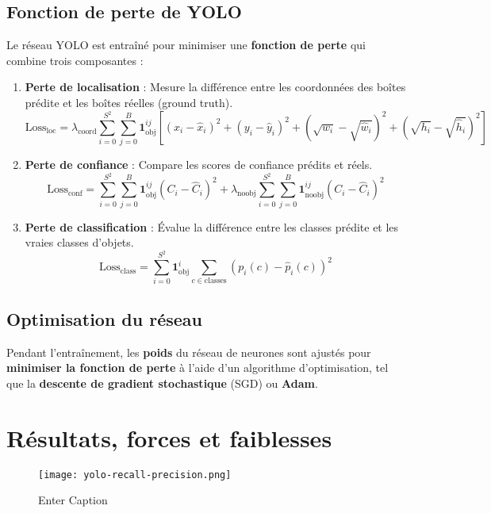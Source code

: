 \documentclass[a4paper,12pt]{article}
\begin{document}
\subsection{Fonction de perte de YOLO}

Le réseau YOLO est entraîné pour minimiser une \textbf{fonction de perte} qui combine trois composantes :
\begin{enumerate}
    \item \textbf{Perte de localisation} : Mesure la différence entre les coordonnées des boîtes prédite et les boîtes réelles (ground truth).
    \[
    \text{Loss}_{\text{loc}} = \lambda_{\text{coord}} \sum_{i=0}^{S^2} \sum_{j=0}^{B} \mathbf{1}_{\text{obj}}^{ij} \left[ (x_i - \hat{x}_i)^2 + (y_i - \hat{y}_i)^2 + \left( \sqrt{w_i} - \sqrt{\hat{w}_i} \right)^2 + \left( \sqrt{h_i} - \sqrt{\hat{h}_i} \right)^2 \right]
    \]
    
    \item \textbf{Perte de confiance} : Compare les scores de confiance prédits et réels.
    \[
    \text{Loss}_{\text{conf}} = \sum_{i=0}^{S^2} \sum_{j=0}^{B} \mathbf{1}_{\text{obj}}^{ij} (C_i - \hat{C}_i)^2 + \lambda_{\text{noobj}} \sum_{i=0}^{S^2} \sum_{j=0}^{B} \mathbf{1}_{\text{noobj}}^{ij} (C_i - \hat{C}_i)^2
    \]
    
    \item \textbf{Perte de classification} : Évalue la différence entre les classes prédite et les vraies classes d'objets.
    \[
    \text{Loss}_{\text{class}} = \sum_{i=0}^{S^2} \mathbf{1}_{\text{obj}}^{i} \sum_{c \in \text{classes}} (p_i(c) - \hat{p}_i(c))^2
    \]
\end{enumerate}

\subsection{Optimisation du réseau}
Pendant l'entraînement, les \textbf{poids} du réseau de neurones sont ajustés pour \textbf{minimiser la fonction de perte} à l'aide d'un algorithme d'optimisation, tel que la \textbf{descente de gradient stochastique} (SGD) ou \textbf{Adam}. 

\section{Résultats, forces et faiblesses}

\begin{figure}[H]
    \centering
    \texttt{[image: yolo-recall-precision.png]}
    \caption{Enter Caption}
    \label{fig:enter-label}
\end{figure}
\end{document}
